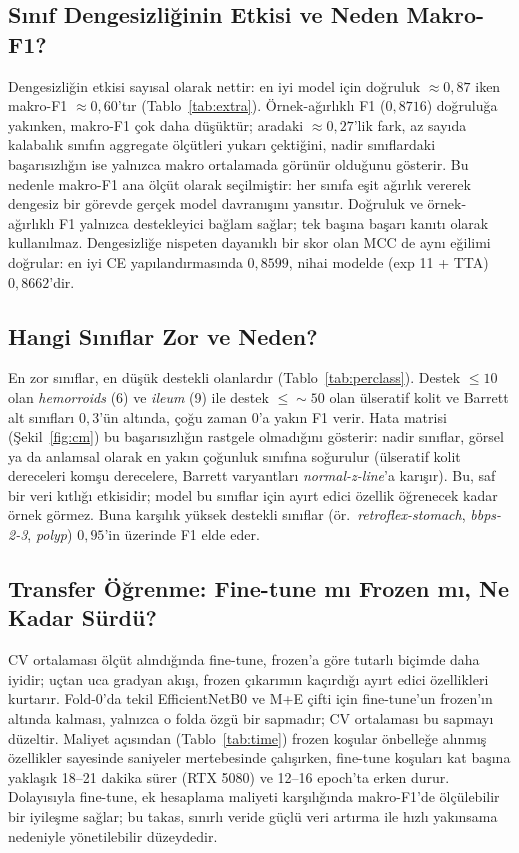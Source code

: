 \subsection{Sınıf Dengesizliğinin Etkisi ve Neden Makro-F1?}
\label{subsec:disc-imbalance}
Dengesizliğin etkisi sayısal olarak nettir: en iyi model için doğruluk
$\approx 0{,}87$ iken makro-F1 $\approx 0{,}60$'tır (Tablo~\ref{tab:extra}).
Örnek-ağırlıklı F1 ($0{,}8716$) doğruluğa yakınken, makro-F1 çok daha düşüktür;
aradaki $\approx 0{,}27$'lik fark, az sayıda kalabalık sınıfın aggregate ölçütleri
yukarı çektiğini, nadir sınıflardaki başarısızlığın ise yalnızca makro ortalamada
görünür olduğunu gösterir. Bu nedenle makro-F1 ana ölçüt olarak seçilmiştir:
her sınıfa eşit ağırlık vererek dengesiz bir görevde gerçek model davranışını
yansıtır. Doğruluk ve örnek-ağırlıklı F1 yalnızca destekleyici bağlam sağlar;
tek başına başarı kanıtı olarak kullanılmaz. Dengesizliğe nispeten dayanıklı bir
skor olan MCC de aynı eğilimi doğrular: en iyi CE yapılandırmasında $0{,}8599$,
nihai modelde (exp 11 + TTA) $0{,}8662$'dir.

\subsection{Hangi Sınıflar Zor ve Neden?}
\label{subsec:disc-hard}
En zor sınıflar, en düşük destekli olanlardır (Tablo~\ref{tab:perclass}). Destek
$\le 10$ olan \textit{hemorroids} (6) ve \textit{ileum} (9) ile destek
$\le \!\sim\!50$ olan ülseratif kolit ve Barrett alt sınıfları $0{,}3$'ün
altında, çoğu zaman $0$'a yakın F1 verir. Hata matrisi (Şekil~\ref{fig:cm}) bu
başarısızlığın rastgele olmadığını gösterir: nadir sınıflar, görsel ya da
anlamsal olarak en yakın çoğunluk sınıfına soğurulur (ülseratif kolit dereceleri
komşu derecelere, Barrett varyantları \textit{normal-z-line}'a karışır). Bu, saf
bir veri kıtlığı etkisidir; model bu sınıflar için ayırt edici özellik
öğrenecek kadar örnek görmez. Buna karşılık yüksek destekli sınıflar (ör.\
\textit{retroflex-stomach}, \textit{bbps-2-3}, \textit{polyp}) $0{,}95$'in
üzerinde F1 elde eder.

\subsection{Transfer Öğrenme: Fine-tune mı Frozen mı, Ne Kadar Sürdü?}
\label{subsec:disc-transfer}
CV ortalaması ölçüt alındığında fine-tune, frozen'a göre tutarlı biçimde daha
iyidir; uçtan uca gradyan akışı, frozen çıkarımın kaçırdığı ayırt edici
özellikleri kurtarır. Fold-0'da tekil EfficientNetB0 ve M+E çifti için fine-tune'un
frozen'ın altında kalması, yalnızca o folda özgü bir sapmadır; CV ortalaması bu
sapmayı düzeltir. Maliyet açısından (Tablo~\ref{tab:time}) frozen koşular
önbelleğe alınmış özellikler sayesinde saniyeler mertebesinde çalışırken,
fine-tune koşuları kat başına yaklaşık 18--21 dakika sürer (RTX 5080) ve 12--16
epoch'ta erken durur. Dolayısıyla fine-tune, ek hesaplama maliyeti karşılığında
makro-F1'de ölçülebilir bir iyileşme sağlar; bu takas, sınırlı veride güçlü veri
artırma ile hızlı yakınsama nedeniyle yönetilebilir düzeydedir.


